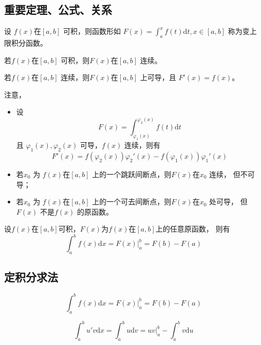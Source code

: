 \subsection{重要定理、公式、关系}

\begin{Def}[变上限函数]

    设 $ f(x) $在$ [a,b] $ 可积，则函数形如 $ F(x)=\int_a^x f(t)\mathrm{d}t, x\in [a,b]  $ 
    称为变上限积分函数。
\end{Def}

\begin{Theo}[变上限积分求导定理]

    若$ f(x) $在$ [a,b] $ 可积，则$ F(x) $在$ [a,b] $ 连续。

    若$ f(x) $在$ [a,b] $ 连续，则$ F(x) $在$ [a,b] $ 上可导，且 $ F'(x) = f(x) $。
\end{Theo}

注意，\begin{itemize}
    \item 设 $$
        F(x)=\int_{\varphi_1(x)}^{\varphi_2(x)} f(t)\mathrm{d}t
    $$ 且 $ \varphi_1(x),\varphi_2(x) $ 可导，$ f(x) $ 连续，则有$$
        F'(x) = f(\varphi_2(x))\varphi_2'(x)-f(\varphi_1(x))\varphi_1'(x)
    $$ 
    \item 若$ x_0 $ 为 $ f(x) $在$ [a,b] $ 上的一个跳跃间断点，则$ F(x) $在$ x_0 $ 连续，
    但不可导；
    \item 若$ x_0 $ 为 $ f(x) $在$ [a,b] $ 上的一个可去间断点，则$ F(x) $在$ x_0 $ 处可导，
    但 $ F(x) $ 不是$ f(x) $ 的原函数。
\end{itemize}

\begin{Theo}[牛顿——莱布尼茨公式]

    设$ f(x) $在$ [a,b] $可积，$ F(x) $为$ f(x) $在$ [a,b] $上的任意原函数，
    则有$$
        \int_a^b f(x)\mathrm{d}x=F(x)\Big|_a^b=F(b)-F(a)
    $$ 
\end{Theo}

\subsection{定积分求法}


$$
   \int_a^b f(x)\mathrm{d}x=F(x)\Big|_a^b=F(b)-F(a)
$$ 


$$
    \int_a^b u'v \mathrm{d}x = \int_a^b u\mathrm{d}v = uv\Big|_a^b - \int_a^b v\mathrm{d}u
$$ 

